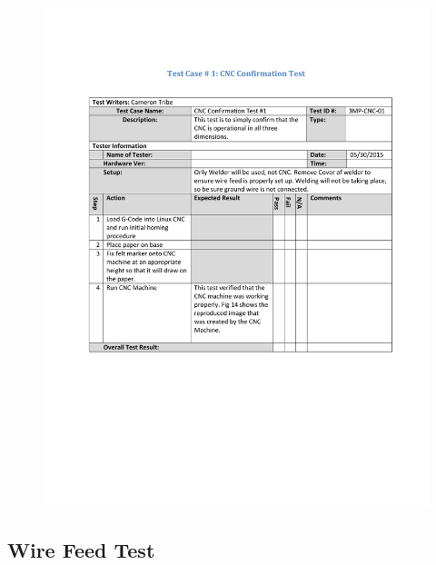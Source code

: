 \documentclass[12pt]{article}
\begin{document}
\begin{figure}[h!]
\centering
\includegraphics[scale=0.95]{TP1}
\end{figure}

\clearpage

\subsection{Wire Feed Test}
\end{document}
